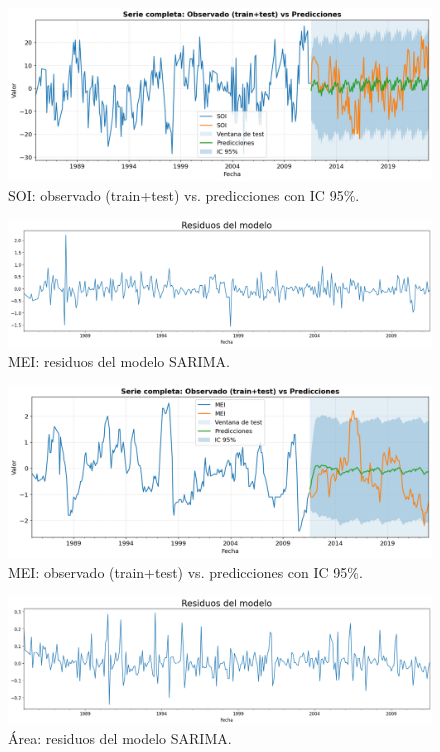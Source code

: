 \begin{figure}[H]\centering
\includegraphics[scale=.42]{Figures/pred_soi.png}
\caption{SOI: observado (train+test) vs. predicciones con IC 95\%.}
\label{fig:pred_soi}
\end{figure}

\begin{figure}[H]\centering
\includegraphics[scale=.30]{Figures/res_sarima_mei.png}
\caption{MEI: residuos del modelo SARIMA.}
\label{fig:res_mei}
\end{figure}


\begin{figure}[H]\centering
\includegraphics[scale=.42]{Figures/pred_mei.png}
\caption{MEI: observado (train+test) vs. predicciones con IC 95\%.}
\label{fig:pred_mei}
\end{figure}

\begin{figure}[H]\centering
\includegraphics[scale=.30]{Figures/res_sarima_area.png}
\caption{Área: residuos del modelo SARIMA.}
\label{fig:res_area}
\end{figure}

